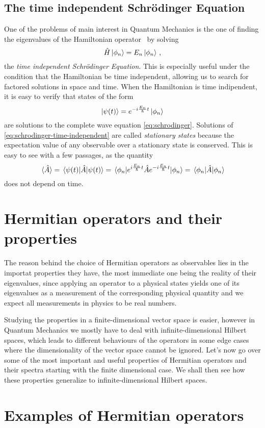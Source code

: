         \subsection{The time independent Schr\"odinger Equation}
            One of the problems of main interest in Quantum Mechanics is the one of finding the eigenvalues of the Hamiltonian operator \hH\ by solving 
            \begin{equation}
                \label{eq:schrodinger-time-independent}
                \hat{H}\ket{\phi_n} = E_n\ket{\phi_n}
                \,\text{,}
            \end{equation}
            the \emph{time independent Schr\"odinger Equation}.
            This is especially useful under the condition that the Hamiltonian be time independent, allowing us to search for factored solutions in space and time. When the Hamiltonian is time indipendent, it is easy to verify that states of the form
            \begin{equation*}
                \ket{\psi\pqty{t}} = \myexp{-i\frac{E_n}{\hbar}t}\ket{\phi_n}
            \end{equation*}
            are solutions to the complete wave equation \eqref{eq:schrodinger}. Solutions of \eqref{eq:schrodinger-time-independent} are called \emph{stationary states} because the expectation value of any observable over a stationary state is conserved. This is easy to see with a few passages, as the quantity
            \begin{equation*}
                \ev*{\hat{A}}
                = \ev{\hat{A}}{\psi\pqty{t}}
                = \ev{\myexp{i\frac{E_n}{\hbar}t}\hat{A}\myexp{-i\frac{E_n}{\hbar}t}}{\phi_n}
                = \ev{\hat{A}}{\phi_n}
            \end{equation*}
            does not depend on time.

    \section{Hermitian operators and their properties}
        The reason behind the choice of Hermitian operators as observables lies in the importat properties they have, the most immediate one being the reality of their eigenvalues, since applying an operator to a physical states yields one of its eigenvalues as a measurement of the corresponding physical quantity and we expect all measurements in physics to be real numbers.
        
        Studying the properties in a finite-dimensional vector space is easier, however in Quantum Mechanics we mostly have to deal with infinite-dimensional Hilbert spaces, which leads to different behaviours of the operators in some edge cases where the dimensionality of the vector space cannot be ignored. Let's now go over some of the most important and useful properties of Hermitian operators and their spectra \cite{Bernardini1993-iy} starting with the finite dimensional case. We shall then see how these properties generalize to infinite-dimensional Hilbert spaces.
        
        
    \section{Examples of Hermitian operators}
